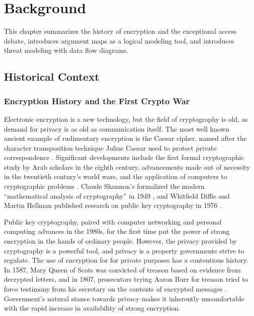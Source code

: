 \chapter{Background}
\label{chap-background}

This chapter summarizes the history of encryption and the exceptional access debate, introduces argument maps as a
logical modeling tool, and introduces threat modeling with data flow diagrams.

\section{Historical Context}
\label{sec-history}

\subsection{Encryption History and the First Crypto War}
\label{sec-crypto-cwi}

Electronic encryption is a new technology, but the field of cryptography is old, as demand for privacy is as old as
communication itself. The most well known ancient example of rudimentary encryption is the Caesar cipher, named after
the character transposition technique Julius Caesar used to protect private correspondence
\cite{luciano_cryptology_1987}. Significant developments include the first formal cryptographic study by Arab scholars
in the eighth century, advancements made out of necessity in the twentieth century's world wars, and the application of
computers to cryptographic problems \cite{kahn_codebreakers_1996}. Claude Shannon's formalized the modern ``mathematical
analysis of cryptography'' in 1949 \cite{shannon_communication_1949}, and Whitfield Diffie and Martin Hellman published
research on public key cryptography in 1976 \cite{diffie_new_1976}.

Public key cryptography, paired with computer networking and personal computing advances in the 1980s, for the first
time put the power of strong encryption in the hands of ordinary people. However, the privacy provided by cryptography
is a powerful tool, and privacy is a property governments strive to regulate. The use of encryption for for private
purposes has a contentious history. In 1587, Mary Queen of Scots was convicted of treason based on evidence from
decrypted letters, and in 1807, prosecutors trying Aaron Burr for treason tried to force testimony from his secretary on
the contents of encrypted messages \cite{kerr_encryption_2017}. Government's natural stance towards privacy makes it
inherently uncomfortable with the rapid increase in availability of strong encryption.

